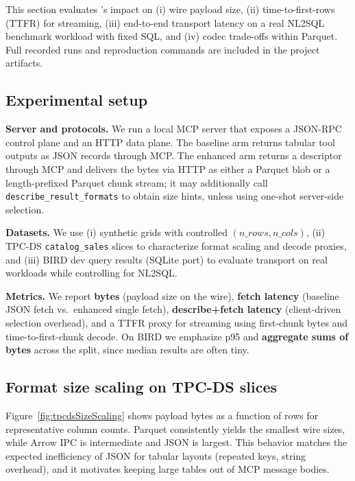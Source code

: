 \label{sec:eval}

This section evaluates \system’s impact on (i) wire payload size, (ii) time-to-first-rows (TTFR) for streaming, (iii) end-to-end transport latency on a real NL2SQL benchmark workload with fixed SQL, and (iv) codec trade-offs within Parquet. Full recorded runs and reproduction commands are included in the project artifacts.

\subsection{Experimental setup}
\noindent\textbf{Server and protocols.}
We run a local MCP server that exposes a JSON-RPC control plane and an HTTP data plane. The baseline arm returns tabular tool outputs as JSON records through MCP. The enhanced arm returns a descriptor through MCP and delivers the bytes via HTTP as either a Parquet blob or a length-prefixed Parquet chunk stream; it may additionally call \texttt{describe\_result\_formats} to obtain size hints, unless using one-shot server-side selection.

\smallskip
\noindent\textbf{Datasets.}
We use (i) synthetic grids with controlled \((n\_rows, n\_cols)\), (ii) TPC-DS \texttt{catalog\_sales} slices to characterize format scaling and decode proxies, and (iii) BIRD dev query results (SQLite port) to evaluate transport on real workloads while controlling for NL2SQL.

\smallskip
\noindent\textbf{Metrics.}
We report \textbf{bytes} (payload size on the wire), \textbf{fetch latency} (baseline JSON fetch vs.\ enhanced single fetch), \textbf{describe+fetch latency} (client-driven selection overhead), and a TTFR proxy for streaming using first-chunk bytes and time-to-first-chunk decode. On BIRD we emphasize p95 and \textbf{aggregate sums of bytes} across the split, since median results are often tiny.

\subsection{Format size scaling on TPC-DS slices}
Figure~\ref{fig:tpcdsSizeScaling} shows payload bytes as a function of rows for representative column counts. Parquet consistently yields the smallest wire sizes, while Arrow IPC is intermediate and JSON is largest. This behavior matches the expected inefficiency of JSON for tabular layouts (repeated keys, string overhead), and it motivates keeping large tables out of MCP message bodies.

